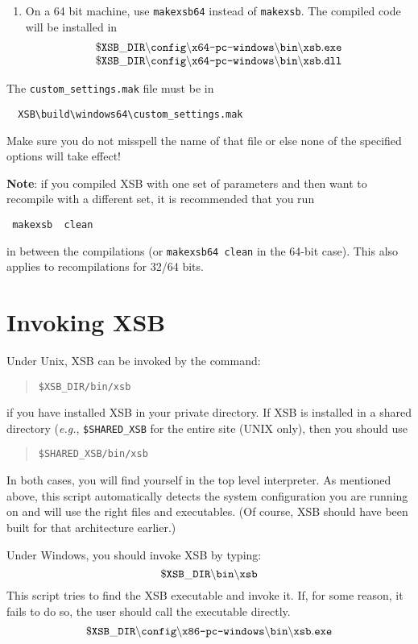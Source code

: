 \begin{enumerate}
\item On a 64 bit machine, use \texttt{makexsb64} instead of
  \texttt{makexsb}. The compiled code will be installed   in
\[
\begin{array}{l}
 \tt
 \$XSB\_DIR\backslash{}config\backslash\texttt{x64-pc-windows}\backslash{}bin\backslash{}xsb.exe
\\
 \tt
 \$XSB\_DIR\backslash{}config\backslash\texttt{x64-pc-windows}\backslash{}bin\backslash{}xsb.dll
 \end{array}
\]
\end{enumerate}
The \texttt{custom\_settings.mak} file must be in
\begin{verbatim}
  XSB\build\windows64\custom_settings.mak  
\end{verbatim}
Make sure you do not misspell the name of that file or else none of the
specified options will take effect!

{\bf Note}: if you compiled XSB with one set of parameters and then want to
recompile with a different set, it is recommended that you run
\begin{verbatim}
 makexsb  clean  
\end{verbatim}
in between the compilations (or \texttt{makexsb64 clean} in the 64-bit
case).  
This also applies to recompilations for 32/64 bits.


\section{Invoking XSB}

Under Unix, XSB can be invoked by the command:
\begin{quote}
       \tt \$XSB\_DIR/bin/xsb
\end{quote}
if you have installed XSB in your private directory.  If XSB is
installed in a shared directory ({\it e.g.}, {\tt \$SHARED\_XSB} for
the entire site (UNIX only), then you should use
\begin{quote}
       \tt \$SHARED\_XSB/bin/xsb
\end{quote}
In both cases, you will find yourself in the top level interpreter.  
As mentioned above, this script automatically detects the system
configuration you are running on and will use the right files and
executables. (Of course, XSB should have been built for that architecture
earlier.)

Under Windows, you should invoke XSB by typing:
\[
 \tt
 \$XSB\_DIR\backslash{}bin\backslash{}xsb
\]
This script tries to find the XSB executable and invoke it. If, for some
reason, it fails to do so, the user should call the executable directly.
\[
 \tt
 \$XSB\_DIR\backslash{}config\backslash\texttt{x86-pc-windows}\backslash{}bin\backslash{}xsb.exe
\]



